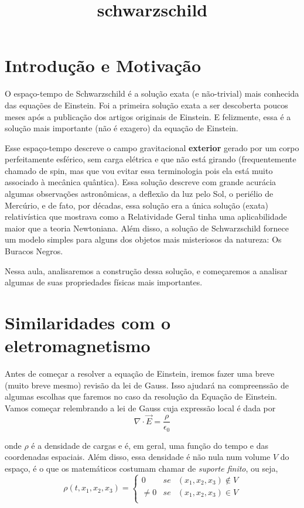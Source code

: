 \documentclass[11pt]{article}
\title{schwarzschild}
\begin{document}
    
    
    
    

    
    \hypertarget{introduuxe7uxe3o-e-motivauxe7uxe3o}{%
\section{Introdução e
Motivação}\label{introduuxe7uxe3o-e-motivauxe7uxe3o}}

    O espaço-tempo de Schwarzschild é a solução exata (e não-trivial) mais
conhecida das equações de Einstein. Foi a primeira solução exata a ser
descoberta poucos meses após a publicação dos artigos originais de
Einstein. E felizmente, essa é a solução mais importante (não é exagero)
da equação de Einstein.

Esse espaço-tempo descreve o campo gravitacional \textbf{exterior}
gerado por um corpo perfeitamente esférico, sem carga elétrica e que não
está girando (frequentemente chamado de spin, mas que vou evitar essa
terminologia pois ela está muito associado à mecânica quântica). Essa
solução descreve com grande acurácia algumas observações astronômicas, a
deflexão da luz pelo Sol, o periélio de Mercúrio, e de fato, por
décadas, essa solução era a única solução (exata) relativística que
mostrava como a Relatividade Geral tinha uma aplicabilidade maior que a
teoria Newtoniana. Além disso, a solução de Schwarzschild fornece um
modelo simples para alguns dos objetos mais misteriosos da natureza: Os
Buracos Negros.

Nessa aula, analisaremos a construção dessa solução, e começaremos a
analisar algumas de suas propriedades físicas mais importantes.

    \hypertarget{similaridades-com-o-eletromagnetismo}{%
\section{Similaridades com o
eletromagnetismo}\label{similaridades-com-o-eletromagnetismo}}

    Antes de começar a resolver a equação de Einstein, iremos fazer uma
breve (muito breve mesmo) revisão da lei de Gauss. Isso ajudará na
compreenssão de algumas escolhas que faremos no caso da resolução da
Equação de Einstein. Vamos começar relembrando a lei de Gauss cuja
expressão local é dada por
\[ \tag{2.1} \nabla \cdot \vec{E} = \frac{\rho}{\epsilon_0}\]

onde \(\rho\) é a densidade de cargas e é, em geral, uma função do tempo
e das coordenadas espaciais. Além disso, essa densidade é não nula num
volume \(V\) do espaço, é o que os matemáticos costumam chamar de
\emph{suporte finito}, ou seja,
\[\tag{2.2} \rho(t, x_1, x_2, x_3) = \left\{\begin{array}{lll}
 0 &se& (x_1, x_2, x_3) \notin V \\
 \neq 0 &se& (x_1, x_2, x_3) \in V \\
\end{array}\right. \]
\end{document}
